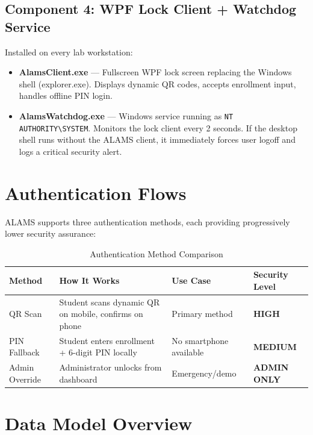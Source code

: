 \subsection{Component 4: WPF Lock Client + Watchdog Service}

Installed on every lab workstation:
\begin{itemize}
  \item \textbf{AlamsClient.exe} — Fullscreen WPF lock screen replacing the Windows shell (explorer.exe). Displays dynamic QR codes, accepts enrollment input, handles offline PIN login.
  \item \textbf{AlamsWatchdog.exe} — Windows service running as \texttt{NT AUTHORITY\textbackslash SYSTEM}. Monitors the lock client every 2 seconds. If the desktop shell runs without the ALAMS client, it immediately forces user logoff and logs a critical security alert.
\end{itemize}

\section{Authentication Flows}

ALAMS supports three authentication methods, each providing progressively lower security assurance:

\begin{table}[h!]
\centering
\caption{Authentication Method Comparison}
\label{tab:auth-methods}
\begin{tabularx}{\textwidth}{lXXl}
\toprule
\textbf{Method} & \textbf{How It Works} & \textbf{Use Case} & \textbf{Security Level}\\
\midrule
\rowcolor{aurxonlightgray}
QR Scan & Student scans dynamic QR on mobile, confirms on phone & Primary method & \textcolor{aurxongreen}{\textbf{HIGH}}\\
PIN Fallback & Student enters enrollment + 6-digit PIN locally & No smartphone available & \textcolor{aurxonamber}{\textbf{MEDIUM}}\\
\rowcolor{aurxonlightgray}
Admin Override & Administrator unlocks from dashboard & Emergency/demo & \textcolor{aurxonred}{\textbf{ADMIN ONLY}}\\
\bottomrule
\end{tabularx}
\end{table}

\section{Data Model Overview}

